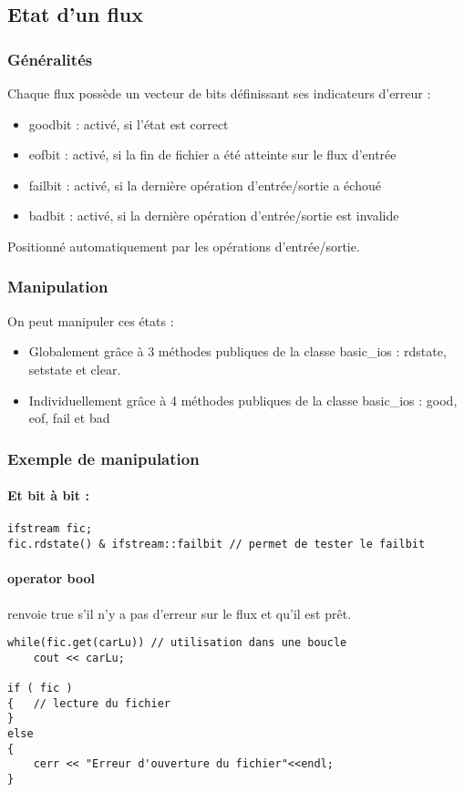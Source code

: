 \documentclass[10pt,a4paper,twoside]{article}
\begin{document}
\subsection{Etat d'un flux}
\subsubsection{Généralités}
Chaque flux possède un vecteur de bits définissant ses indicateurs d'erreur :
\begin{itemize}
\item goodbit : activé, si l'état est correct
\item eofbit : activé, si la fin de fichier a été atteinte sur le flux d'entrée
\item failbit : activé, si la dernière opération d'entrée/sortie a échoué
\item badbit : activé, si la dernière opération d'entrée/sortie est invalide
\end{itemize}
Positionné automatiquement par les opérations d'entrée/sortie.

\subsubsection{Manipulation}
On peut manipuler ces états : 
\begin{itemize}
\item Globalement grâce à 3 méthodes publiques de la classe basic\_ios : rdstate, setstate et clear.
\item Individuellement grâce à 4 méthodes publiques de la classe basic\_ios : good, eof, fail et bad
\end{itemize}

\subsubsection{Exemple de manipulation}
\paragraph{Et bit à bit :}
\begin{verbatim}
ifstream fic;
fic.rdstate() & ifstream::failbit // permet de tester le failbit
\end{verbatim}

\paragraph{operator bool } renvoie true s'il n'y a pas d'erreur sur le flux et qu'il est prêt.
\begin{verbatim}
while(fic.get(carLu)) // utilisation dans une boucle
	cout << carLu;
	
if ( fic )
{	// lecture du fichier
}
else
{
	cerr << "Erreur d'ouverture du fichier"<<endl;
}
\end{verbatim}
\end{document}
